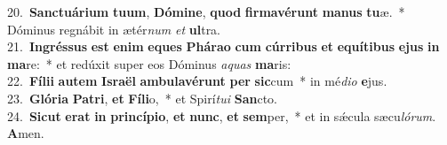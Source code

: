 {20.~}\textbf{San}\textbf{ctu}\textbf{á}\textbf{ri}\textbf{um} \textbf{tu}\textbf{um}, \textbf{Dó}\textbf{mi}\textbf{ne}, \textbf{quod} \textbf{fir}\textbf{ma}\textbf{vé}\textbf{runt} \textbf{ma}\textbf{nus} \textbf{tu}æ.~* Dóminus regnábit in ætér\textit{num} \textit{et} \textbf{ul}tra.\\
{21.~}\textbf{In}\textbf{grés}\textbf{sus} \textbf{est} \textbf{e}\textbf{nim} \textbf{e}\textbf{ques} \textbf{Phá}\textbf{ra}\textbf{o} \textbf{cum} \textbf{cúr}\textbf{ri}\textbf{bus} \textbf{et} \textbf{e}\textbf{quí}\textbf{ti}\textbf{bus} \textbf{e}\textbf{jus} \textbf{in} \textbf{ma}re:~* et redúxit super eos Dóminus \textit{a}\textit{quas} \textbf{ma}ris:\\
{22.~}\textbf{Fí}\textbf{li}\textbf{i} \textbf{au}\textbf{tem} \textbf{Is}\textbf{ra}\textbf{ël} \textbf{am}\textbf{bu}\textbf{la}\textbf{vé}\textbf{runt} \textbf{per} \textbf{sic}cum~* in mé\textit{di}\textit{o} \textbf{e}jus.\\
{23.~}\textbf{Gló}\textbf{ri}\textbf{a} \textbf{Pa}\textbf{tri}, \textbf{et} \textbf{Fí}\textbf{li}o,~* et Spirí\textit{tu}\textit{i} \textbf{San}cto.\\
{24.~}\textbf{Si}\textbf{cut} \textbf{e}\textbf{rat} \textbf{in} \textbf{prin}\textbf{cí}\textbf{pi}\textbf{o}, \textbf{et} \textbf{nunc}, \textbf{et} \textbf{sem}per,~* et in sǽcula sæcu\textit{ló}\textit{rum}. \textbf{A}men.\\
